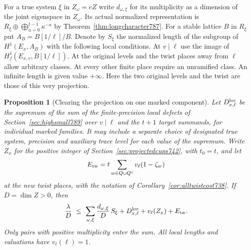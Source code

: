 \documentclass[a4paper,11pt]{article}
\newtheorem{proposition}{Proposition}[section]
\theoremstyle{definition}
\theoremstyle{remark}
\numberwithin{equation}{section}
\begin{document}
For a true system \(\xi\) in \(Z_\omega=eZ\) write \(d_{\omega,\xi}\)
for its multiplicity as a dimension of the joint eigenspace
in \(Z_\omega\). Its actual normalized representation is
\(R_\xi\oplus\bigoplus_{a=0}^{t-1}\kappa^{-a}\) by
Theorem~\ref{thm:longcharacter787}. For a stable lattice \(B\)
in \(R_\xi\) put \(A_B=B[1/\ell]/B\). Denote by \(S_\xi\)
the normalized length of the subgroup of \(H^1(E_x,A_B)\)
with the following local conditions. At \(v\mid\ell\) use the
image of \(H^1_f(E_{x,v},B[1/\ell])\). At the original levels
and the twist places away from \(\ell\) allow arbitrary classes.
At every other finite place require an unramified class. An
infinite length is given value \(+\infty\). Here the two original
levels and the twist are those of this very projection.

\begin{proposition}[Clearing the projection on one marked component]
\leavevmode\label{prop:markedclear802}
Let \(D_{x,\ell}^{\rm loc}\) be the supremum of the sum of the
finite-precision local defects of Section~\ref{sec:highsmall789}
over \(v\mid\ell\) and the \(t+1\) target summands, for individual
marked families. It may include a separate choice of designated
true system, precision and auxiliary trace level for each value
of the supremum. Write \(Z_x\) for the positive integer of
Section~\ref{sec:projectedcups742}, with \(t_0=t\), and let
\[
              E_{\rm tw}=t\sum_{w\in Q\cup Q^c}
                                v_\ell(1-\zeta_w)
\]
at the new twist places, with the notation of
Corollary~\ref{cor:alltwistcost738}. If \(D=\dim Z>0\), then
\[
 \frac{\lambda}{D}\ \le\
       \sum_{\omega,\xi}\frac{d_{\omega,\xi}}{D}\,S_\xi
                    +D_{x,\ell}^{\rm loc}+v_\ell(Z_x)+E_{\rm tw}.
\]
Only pairs with positive multiplicity enter the sum. All local
lengths and valuations have \(v_\ell(\ell)=1\).
\end{proposition}
\end{document}
